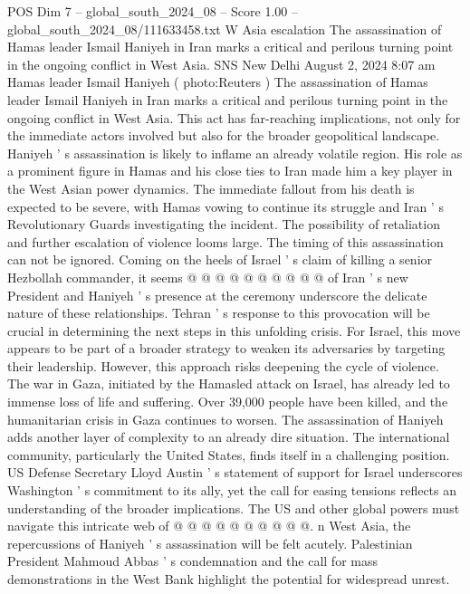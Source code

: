 \begin{textsample}{POS Dim 7 – global\_south\_2024\_08 – Score 1.00 – global\_south\_2024\_08/111633458.txt}  \label{ex:f7_pos_075}
W Asia escalation The assassination of Hamas leader Ismail Haniyeh in Iran marks a critical and perilous turning point in the ongoing conflict in West Asia.
SNS New Delhi August 2, 2024 8:07 am Hamas leader Ismail Haniyeh ( photo:Reuters ) The assassination of Hamas leader Ismail Haniyeh in Iran marks a critical and perilous turning point in the ongoing conflict in West Asia.
This act has far-reaching implications, not only for the immediate actors involved but also for the broader geopolitical landscape.
Haniyeh ' s assassination is likely to inflame an already volatile region.
His role as a prominent figure in Hamas and his close ties to Iran made him a key player in the West Asian power dynamics.
The immediate fallout from his death is expected to be severe, with Hamas vowing to continue its struggle and Iran ' s Revolutionary Guards investigating the incident.
The possibility of retaliation and further escalation of violence looms large.
The timing of this assassination can not be ignored.
Coming on the heels of Israel ' s claim of killing a senior Hezbollah commander, it seems @ @ @ @ @ @ @ @ @ @ of Iran ' s new President and Haniyeh ' s presence at the ceremony underscore the delicate nature of these relationships.
Tehran ' s response to this provocation will be crucial in determining the next steps in this unfolding crisis.
For Israel, this move appears to be part of a broader strategy to weaken its adversaries by targeting their leadership.
However, this approach risks deepening the cycle of violence.
The war in Gaza, initiated by the Hamasled attack on Israel, has already led to immense loss of life and suffering.
Over 39,000 people have been killed, and the humanitarian crisis in Gaza continues to worsen.
The assassination of Haniyeh adds another layer of complexity to an already dire situation.
The international community, particularly the United States, finds itself in a challenging position.
US Defense Secretary Lloyd Austin ' s statement of support for Israel underscores Washington ' s commitment to its ally, yet the call for easing tensions reflects an understanding of the broader implications.
The US and other global powers must navigate this intricate web of @ @ @ @ @ @ @ @ @ @. n West Asia, the repercussions of Haniyeh ' s assassination will be felt acutely.
Palestinian President Mahmoud Abbas ' s condemnation and the call for mass demonstrations in the West Bank highlight the potential for widespread unrest.

\end{textsample}
